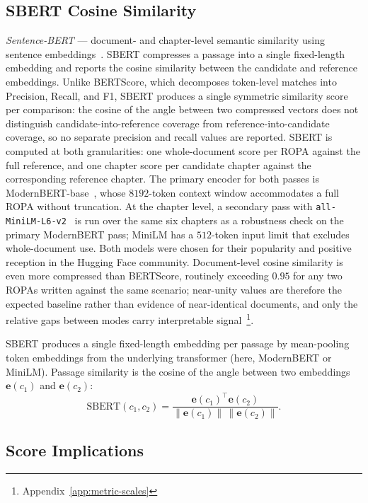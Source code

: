 \subsection{SBERT Cosine Similarity}

\emph{Sentence-BERT} --- document- and chapter-level semantic similarity using sentence embeddings~\cite{Reimers2019}. SBERT compresses a passage into a single fixed-length embedding and reports the cosine similarity between the candidate and reference embeddings. Unlike BERTScore, which decomposes token-level matches into Precision, Recall, and F1, SBERT produces a single symmetric similarity score per comparison: the cosine of the angle between two compressed vectors does not distinguish candidate-into-reference coverage from reference-into-candidate coverage, so no separate precision and recall values are reported. SBERT is computed at both granularities: one whole-document score per ROPA against the full reference, and one chapter score per candidate chapter against the corresponding reference chapter. The primary encoder for both passes is ModernBERT-base~\cite{HFModernBERTBase}, whose $8192$-token context window accommodates a full ROPA without truncation. At the chapter level, a secondary pass with \texttt{all-MiniLM-L6-v2}~\cite{HFMiniLML6v2} is run over the same six chapters as a robustness check on the primary ModernBERT pass; MiniLM has a $512$-token input limit that excludes whole-document use. Both models were chosen for their popularity and positive reception in the Hugging Face community. Document-level cosine similarity is even more compressed than BERTScore, routinely exceeding $0.95$ for any two ROPAs written against the same scenario; near-unity values are therefore the expected baseline rather than evidence of near-identical documents, and only the relative gaps between modes carry interpretable signal~\footnote{Appendix~\ref{app:metric-scales}}.

SBERT produces a single fixed-length embedding per passage by mean-pooling token embeddings from the underlying transformer (here, ModernBERT or MiniLM). Passage similarity is the cosine of the angle between two embeddings $\mathbf{e}(c_1)$ and $\mathbf{e}(c_2)$:
\begin{equation}
\label{eq:sbert}
\mathrm{SBERT}(c_1, c_2) = \frac{\mathbf{e}(c_1)^{\top} \mathbf{e}(c_2)}{\| \mathbf{e}(c_1) \| \, \| \mathbf{e}(c_2) \|}.
\end{equation}

\subsection{Score Implications}
\label{ssec:score-implications}

